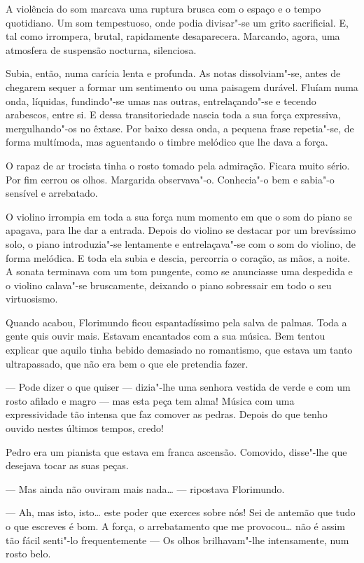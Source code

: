A violência do som marcava uma ruptura brusca com o espaço e o tempo
quotidiano. Um som tempestuoso, onde podia divisar"-se um grito
sacrificial. E, tal como irrompera, brutal, rapidamente desaparecera.
Marcando, agora, uma atmosfera de suspensão nocturna, silenciosa.

Subia, então, numa carícia lenta e profunda. As notas dissolviam"-se,
antes de chegarem sequer a formar um sentimento ou uma paisagem durável.
Fluíam numa onda, líquidas, fundindo"-se umas nas outras, entrelaçando"-se
e tecendo arabescos, entre si. E dessa transitoriedade nascia toda a sua
força expressiva, mergulhando"-os no êxtase. Por baixo dessa onda, a
pequena frase repetia"-se, de forma multímoda, mas aguentando o timbre
melódico que lhe dava a força.

O rapaz de ar trocista tinha o rosto tomado pela admiração. Ficara muito
sério. Por fim cerrou os olhos. Margarida observava"-o. Conhecia"-o bem e
sabia"-o sensível e arrebatado.

O violino irrompia em toda a sua força num momento em que o som do piano
se apagava, para lhe dar a entrada. Depois do violino se destacar por um
brevíssimo solo, o piano introduzia"-se lentamente e entrelaçava"-se com o
som do violino, de forma melódica. E toda ela subia e descia, percorria
o coração, as mãos, a noite. A sonata terminava com um tom pungente,
como se anunciasse uma despedida e o violino calava"-se bruscamente,
deixando o piano sobressair em todo o seu virtuosismo.

Quando acabou, Florimundo ficou espantadíssimo pela salva de palmas.
Toda a gente quis ouvir mais. Estavam encantados com a sua música. Bem
tentou explicar que aquilo tinha bebido demasiado no romantismo, que
estava um tanto ultrapassado, que não era bem o que ele pretendia fazer.

--- Pode dizer o que quiser --- dizia"-lhe uma senhora vestida de verde e com
um rosto afilado e magro --- mas esta peça tem alma! Música com uma
expressividade tão intensa que faz comover as pedras. Depois do que
tenho ouvido nestes últimos tempos, credo!

Pedro era um pianista que estava em franca ascensão. Comovido, disse"-lhe
que desejava tocar as suas peças.

--- Mas ainda não ouviram mais nada\ldots{} --- ripostava Florimundo.

--- Ah, mas isto, isto\ldots{} este poder que exerces sobre nós! Sei de antemão
que tudo o que escreves é bom. A força, o arrebatamento que me
provocou\ldots{} não é assim tão fácil senti"-lo frequentemente --- Os olhos
brilhavam"-lhe intensamente, num rosto belo.

